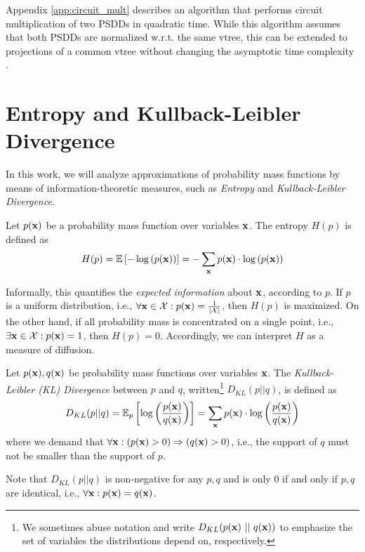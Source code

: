 Appendix \ref{app:circuit_mult} describes an algorithm that performs circuit multiplication of two PSDDs in quadratic time. While this algorithm assumes that both PSDDs are normalized w.r.t. the same vtree, this can be extended to projections of a common vtree without changing the asymptotic time complexity \cite{tractable_ops}.

\section{Entropy and Kullback-Leibler Divergence}
In this work, we will analyze approximations of probability mass functions by means of information-theoretic measures, such as \textit{Entropy} and \textit{Kullback-Leibler Divergence}.

\begin{definition}[Entropy]
    Let $p(\mathbf{x})$ be a probability mass function over variables $\mathbf{x}$. The entropy $H(p)$ is defined as 
    \begin{align}
        H(p) = \mathbb{E} \left[ -\log \left( p(\mathbf{x}) \right) \right] = -\sum_{\mathbf{x}} p(\mathbf{x}) \cdot \log \left( p(\mathbf{x}) \right)
    \end{align}
\end{definition}
Informally, this quantifies the \textit{expected information} about $\mathbf{x}$, according to $p$.
If $p$ is a uniform distribution, i.e., $\forall \mathbf{x} \in \mathcal{X}: p(\mathbf{x}) = \frac{1}{|\mathcal{X}|}$, then $H(p)$ is maximized. On the other hand, if all probability mass is concentrated on a single point, i.e., $\exists \mathbf{x} \in \mathcal{X}: p(\mathbf{x}) = 1$, then $H(p) = 0$. Accordingly, we can interpret $H$ as a measure of diffusion.

\begin{definition}
    Let $p(\mathbf{x}), q(\mathbf{x})$ be probability mass functions over variables $\mathbf{x}$. The \textit{Kullback-Leibler (KL) Divergence} between $p$ and $q$, written\footnote{We sometimes abuse notation and write $D_{KL}(p(\mathbf{x}) \ || \ q(\mathbf{x}))$ to emphasize the set of variables the distributions depend on, respectively.} $D_{KL}(p || q)$, is defined as 
    \begin{align}
        D_{KL}(p || q) = \mathbb{E}_p \left[ \log \left( \frac{p(\mathbf{x})}{q(\mathbf{x})} \right) \right] = \sum_{\mathbf{x}} p(\mathbf{x}) \cdot \log \left( \frac{p(\mathbf{x})}{q(\mathbf{x})} \right)
    \end{align}
    where we demand that $\forall \mathbf{x}: (p(\mathbf{x}) > 0) \Rightarrow (q(\mathbf{x}) > 0)$, i.e., the support of $q$ must not be smaller than the support of $p$.
\end{definition}
Note that $D_{KL}(p || q)$ is non-negative for any $p,q$ and is only $0$ if and only if $p,q$ are identical, i.e., $\forall \mathbf{x}: p(\mathbf{x}) = q(\mathbf{x})$.